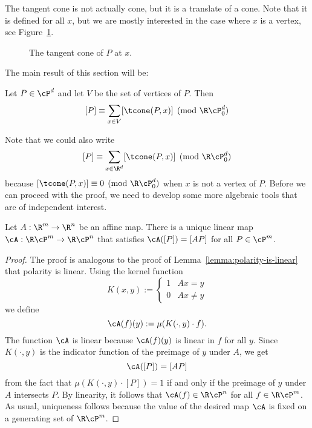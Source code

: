 The tangent cone is not actually cone, but it is a translate of a cone.
Note that it is defined for all $x$,
but we are mostly interested in the case where $x$ is a vertex, see Figure~\ref{fig:tangent-cone}.
\begin{figure}
  \begin{center}
  \end{center}
  \caption{The tangent cone of $P$ at $x$.}
  \label{fig:tangent-cone}
\end{figure}
The main result of this section will be:

\begin{theorem}[Brion]
  \label{thm:brion}
  Let $P \in \cP^d$ and let $V$ be the set of vertices of $P$.
  Then
  \[
    [P] \equiv \sum_{x \in V} [\tcone(P,x)] \pmod{\R\cP_0^d}
  \]
\end{theorem}

Note that we could also write
\[
  [P] \equiv \sum_{x \in \R^d} [\tcone(P,x)] \pmod{\R\cP_0^d}
\]
because $[\tcone(P,x)] \equiv 0 \pmod{\R\cP_0^d}$ when $x$ is not a vertex of $P$.
Before we can proceed with the proof,
we need to develop some more algebraic tools that are of independent interest.

\begin{lemma}
  \label{lemma:polyhedra-affine}
  Let $A : \R^m \to \R^n$ be an affine map.
  There is a unique linear map $\cA: \R\cP^m \to \R\cP^n$
  that satisfies $\cA([P]) = [AP]$ for all $P \in \cP^m$.
\end{lemma}
\begin{proof}
  The proof is analogous to the proof of Lemma~\ref{lemma:polarity-is-linear} that polarity is linear.
  Using the kernel function
  \[
    K(x,y) := \begin{cases} 1 & Ax = y \\ 0 & Ax \neq y \end{cases}
  \]
  we define
  \[
    \cA(f)(y) := \mu(K(\cdot, y) \cdot f).
  \]
  The function $\cA$ is linear because $\cA(f)(y)$ is linear in $f$ for all $y$.
  Since $K(\cdot,y)$ is the indicator function of the preimage of $y$ under $A$,
  we get
  \[
    \cA([P]) = [AP]
  \]
  from the fact that $\mu(K(\cdot, y) \cdot [P]) = 1$ if and only if the preimage of $y$ under $A$ intersects $P$.
  By linearity, it follows that $\cA(f) \in \R\cP^n$ for all $f \in \R\cP^m$.
  As usual, uniqueness follows because the value of the desired map $\cA$ is fixed on a generating set of $\R\cP^m$.
\end{proof}

